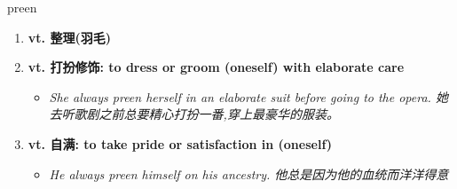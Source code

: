 
\begin{frame}
{\huge preen}
\begin{center}
\begin{enumerate}\Large
  \item \textbf{vt. 整理(羽毛)}
  \item \textbf{vt. 打扮修饰: to dress or groom (oneself) with elaborate care}
  \begin{itemize}
    \item \em{\Large{She always preen herself in an elaborate suit before going to the opera. 她去听歌剧之前总要精心打扮一番,穿上最豪华的服装。}}
  \end{itemize}
  \item \textbf{vt. 自满: to take pride or satisfaction in (oneself)}
  \begin{itemize}
    \item \em{\Large{He always preen himself on his ancestry. 他总是因为他的血统而洋洋得意}}
  \end{itemize}
\end{enumerate}
\end{center}
\end{frame}
